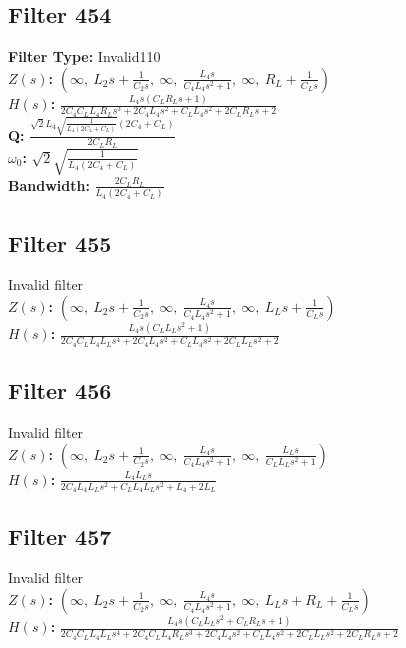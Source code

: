 \documentclass{article}
\begin{document}
\subsection*{Filter 454}
\textbf{Filter Type:} Invalid110 \\ 
\textbf{$Z(s)$:} $\left( \infty, \  L_{2} s + \frac{1}{C_{2} s}, \  \infty, \  \frac{L_{4} s}{C_{4} L_{4} s^{2} + 1}, \  \infty, \  R_{L} + \frac{1}{C_{L} s}\right)$ \\ 
\textbf{$H(s)$:} $\frac{L_{4} s \left(C_{L} R_{L} s + 1\right)}{2 C_{4} C_{L} L_{4} R_{L} s^{3} + 2 C_{4} L_{4} s^{2} + C_{L} L_{4} s^{2} + 2 C_{L} R_{L} s + 2}$ \\ 
\textbf{Q:} $\frac{\sqrt{2} L_{4} \sqrt{\frac{1}{L_{4} \left(2 C_{4} + C_{L}\right)}} \left(2 C_{4} + C_{L}\right)}{2 C_{L} R_{L}}$ \\ 
\textbf{$\omega_0$:} $\sqrt{2} \sqrt{\frac{1}{L_{4} \left(2 C_{4} + C_{L}\right)}}$ \\ 
\textbf{Bandwidth:} $\frac{2 C_{L} R_{L}}{L_{4} \left(2 C_{4} + C_{L}\right)}$ \\ 
\subsection*{Filter 455}
Invalid filter \\ 
\textbf{$Z(s)$:} $\left( \infty, \  L_{2} s + \frac{1}{C_{2} s}, \  \infty, \  \frac{L_{4} s}{C_{4} L_{4} s^{2} + 1}, \  \infty, \  L_{L} s + \frac{1}{C_{L} s}\right)$ \\ 
\textbf{$H(s)$:} $\frac{L_{4} s \left(C_{L} L_{L} s^{2} + 1\right)}{2 C_{4} C_{L} L_{4} L_{L} s^{4} + 2 C_{4} L_{4} s^{2} + C_{L} L_{4} s^{2} + 2 C_{L} L_{L} s^{2} + 2}$ \\ 
\subsection*{Filter 456}
Invalid filter \\ 
\textbf{$Z(s)$:} $\left( \infty, \  L_{2} s + \frac{1}{C_{2} s}, \  \infty, \  \frac{L_{4} s}{C_{4} L_{4} s^{2} + 1}, \  \infty, \  \frac{L_{L} s}{C_{L} L_{L} s^{2} + 1}\right)$ \\ 
\textbf{$H(s)$:} $\frac{L_{4} L_{L} s}{2 C_{4} L_{4} L_{L} s^{2} + C_{L} L_{4} L_{L} s^{2} + L_{4} + 2 L_{L}}$ \\ 
\subsection*{Filter 457}
Invalid filter \\ 
\textbf{$Z(s)$:} $\left( \infty, \  L_{2} s + \frac{1}{C_{2} s}, \  \infty, \  \frac{L_{4} s}{C_{4} L_{4} s^{2} + 1}, \  \infty, \  L_{L} s + R_{L} + \frac{1}{C_{L} s}\right)$ \\ 
\textbf{$H(s)$:} $\frac{L_{4} s \left(C_{L} L_{L} s^{2} + C_{L} R_{L} s + 1\right)}{2 C_{4} C_{L} L_{4} L_{L} s^{4} + 2 C_{4} C_{L} L_{4} R_{L} s^{3} + 2 C_{4} L_{4} s^{2} + C_{L} L_{4} s^{2} + 2 C_{L} L_{L} s^{2} + 2 C_{L} R_{L} s + 2}$ \\ 
\end{document}

